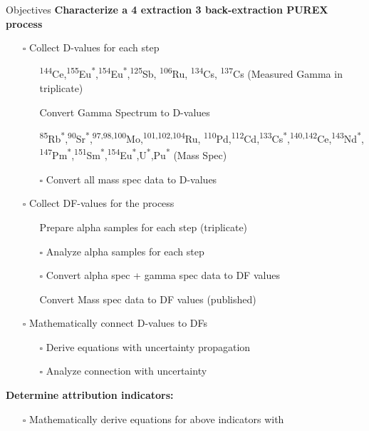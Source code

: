 \documentclass{beamer}
\newcommand{\tss}{\textsuperscript}
\newcommand{\cmark}{\ding{51}}%
\newcommand{\done}{\rlap{$\square$}{\raisebox{2pt}{\large\hspace{1pt}\cmark}}%
  \hspace{-2.5pt}}
\newcommand{\notdone}{$\square$}
\begin{document}
\begin{frame}[allowframebreaks]{Objectives}
\vspace{-0.7cm}
\textbf{\small Characterize a 4 extraction 3 back-extraction PUREX process}
\begin{itemize}
\item[\notdone]{Collect D-values for each step}
  \begin{itemize}
  \item[\tiny\done]{\tiny \tss{144}Ce,\tss{155}Eu\tss{*},\tss{154}Eu\tss{*},\tss{125}Sb,
    \tss{106}Ru, \tss{134}Cs, \tss{137}Cs (Measured Gamma in triplicate)}
  \item[\tiny\done]{\tiny Convert Gamma Spectrum to D-values}
  \item[\tiny\done]{\tiny \tss{85}Rb\tss{*},\tss{90}Sr\tss{*},\tss{97,98,100}Mo,\tss{101,102,104}Ru,
    \tss{110}Pd,\tss{112}Cd,\tss{133}Cs\tss{*},\tss{140,142}Ce,\tss{143}Nd\tss{*},
    \tss{147}Pm\tss{*},\tss{151}Sm\tss{*},\tss{154}Eu\tss{*},U\tss{*},Pu\tss{*} (Mass Spec)}
  \item[\tiny\notdone]{\tiny Convert all mass spec data to D-values}
  \end{itemize}
\item[\notdone]{Collect DF-values for the process}
  \begin{itemize}
  \item[\tiny\done]{\tiny Prepare alpha samples for each step (triplicate)}
  \item[\tiny\notdone]{\tiny Analyze alpha samples for each step}
  \item[\tiny\notdone]{\tiny Convert alpha spec + gamma spec data to DF values}
  \item[\tiny\done]{\tiny Convert Mass spec data to DF values (published)}
  \end{itemize}
\item[\notdone]{Mathematically connect D-values to DFs}
  \begin{itemize}
  \item[\tiny\notdone]{\tiny Derive equations with uncertainty propagation}
  \item[\tiny\notdone]{\tiny Analyze connection with uncertainty}
  \end{itemize}
\end{itemize}
\framebreak
\vspace*{-1cm}
\textbf{\small Determine attribution indicators:}
\begin{itemize}
\item[\notdone]{\small Mathematically derive equations for above indicators with
}
\end{itemize}
\end{frame}
\end{document}
